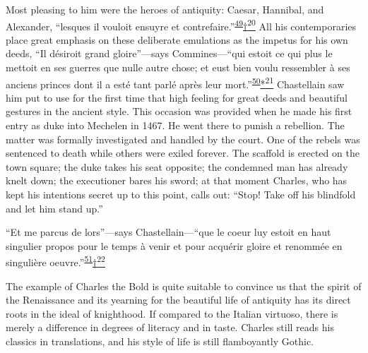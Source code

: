 Most pleasing to him were the heroes of antiquity: Caesar, Hannibal, and
Alexander, ``lesques il vouloit ensuyre et
contrefaire.''\textsuperscript{\protect\hypertarget{10_Chapter_Three__THE_HEROIC_DREAM.xhtmlux5cux23id_1835}{\protect\hyperlink{23_NOTES.xhtmlux5cux23id_1836}{49}}}\protect\hypertarget{10_Chapter_Three__THE_HEROIC_DREAM.xhtmlux5cux23id_2499}{\protect\hyperlink{23_NOTES.xhtmlux5cux23id_2500}{†\textsuperscript{20}}}
All his contemporaries place great emphasis on these deliberate
emulations as the impetus for his own deeds, ``Il désiroit grand
\protect\hypertarget{10_Chapter_Three__THE_HEROIC_DREAM.xhtmlux5cux23page_76}{}{}gloire''---says
Commines---``qui estoit ce qui plus le mettoit en ses guerres que nulle
autre chose; et eust bien voulu ressembler à ses anciens princes dont il
a esté tant parlé après leur
mort.''\textsuperscript{\protect\hypertarget{10_Chapter_Three__THE_HEROIC_DREAM.xhtmlux5cux23id_1833}{\protect\hyperlink{23_NOTES.xhtmlux5cux23id_1834}{50}}}\protect\hypertarget{10_Chapter_Three__THE_HEROIC_DREAM.xhtmlux5cux23id_2503}{\protect\hyperlink{23_NOTES.xhtmlux5cux23id_2504}{*\textsuperscript{21}}}
Chastellain saw him put to use for the first time that high feeling for
great deeds and beautiful gestures in the ancient style. This occasion
was provided when he made his first entry as duke into Mechelen in 1467.
He went there to punish a rebellion. The matter was formally
investigated and handled by the court. One of the rebels was sentenced
to death while others were exiled forever. The scaffold is erected on
the town square; the duke takes his seat opposite; the condemned man has
already knelt down; the executioner bares his sword; at that moment
Charles, who has kept his intentions secret up to this point, calls out:
``Stop! Take off his blindfold and let him stand up.''

``Et me parcus de lors''---says Chastellain---``que le coeur luy estoit
en haut singulier propos pour le temps à venir et pour acquérir gloire
et renommée en singulière
oeuvre.''\textsuperscript{\protect\hypertarget{10_Chapter_Three__THE_HEROIC_DREAM.xhtmlux5cux23id_1831}{\protect\hyperlink{23_NOTES.xhtmlux5cux23id_1832}{51}}}\protect\hypertarget{10_Chapter_Three__THE_HEROIC_DREAM.xhtmlux5cux23id_2505}{\protect\hyperlink{23_NOTES.xhtmlux5cux23id_2506}{†\textsuperscript{22}}}

The example of Charles the Bold is quite suitable to convince us that
the spirit of the Renaissance and its yearning for the beautiful life of
antiquity has its direct roots in the ideal of knighthood. If compared
to the Italian virtuoso, there is merely a difference in degrees of
literacy and in taste. Charles still reads his classics in translations,
and his style of life is still flamboyantly Gothic.

